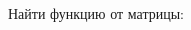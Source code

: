 	Найти функцию от матрицы:
	\begin{multicols}{2}
		\begin{enumtasks}


\end{enumtasks}
\end{multicols}
